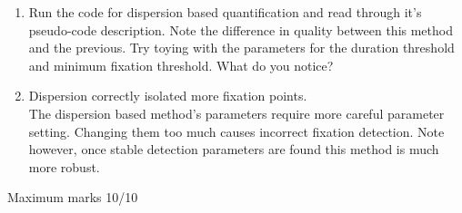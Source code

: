 \documentclass[12pt,english]{scrartcl}
\begin{document}
\begin{enumerate}
 \color{black}
 \item Run the code for dispersion based quantification and read through it's pseudo-code description. Note the difference in quality between this method and the previous. Try toying with the parameters for the duration threshold and minimum fixation threshold. What do you notice? \\
 \item[]
 \color{blue}
 Dispersion correctly isolated more fixation points. \\
 
 The dispersion based method's parameters require more careful parameter setting. Changing them too much causes incorrect fixation detection. Note however, once stable detection parameters are found this method is much more robust.
  

 \end{enumerate}
 \color{black}
 Maximum marks 10/10 \\
\end{document}
